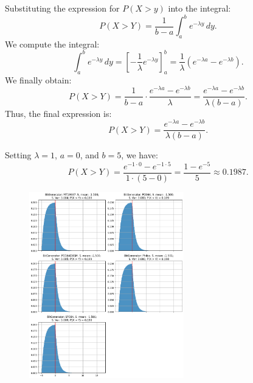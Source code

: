 \documentclass[a4paper,12pt]{article}
\begin{document}
Substituting the expression for $P(X > y)$ into the integral:
\[
P(X > Y) = \frac{1}{b-a} \int_a^b e^{-\lambda y} \, dy.
\]
We compute the integral:
\[
\int_a^b e^{-\lambda y} \, dy = \left[ -\frac{1}{\lambda} e^{-\lambda y} \right]_a^b = \frac{1}{\lambda}\left(e^{-\lambda a} - e^{-\lambda b}\right).
\]
We finally obtain:
\[
P(X > Y) = \frac{1}{b-a} \cdot \frac{e^{-\lambda a} - e^{-\lambda b}}{\lambda} = \frac{e^{-\lambda a} - e^{-\lambda b}}{\lambda (b-a)}.
\]
Thus, the final expression is:
\[
\boxed{P(X > Y) = \frac{e^{-\lambda a} - e^{-\lambda b}}{\lambda (b-a)}.}
\]

Setting $\lambda=1$, $a=0$, and $b=5$, we have:
\[
P(X > Y) = \frac{e^{-1\cdot 0} - e^{-1\cdot 5}}{1\cdot (5-0)} = \frac{1 - e^{-5}}{5} \approx 0.1987.
\]

\begin{figure}[h]
    \includegraphics[width=0.6\textwidth]{ex2-plot.png}
\end{figure}
\end{document}
